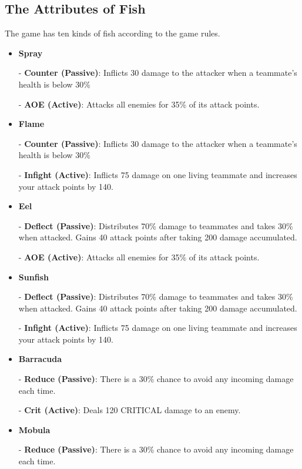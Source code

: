 \subsection{The Attributes of Fish} \label{app:fish_attribute}
The game has ten kinds of fish according to the game rules.
\begin{itemize}[leftmargin=1.5em,itemsep=0pt,parsep=0.2em,topsep=0.0em,partopsep=0.0em]
\item \textbf{Spray} 
    
    - \textbf{Counter (Passive)}: Inflicts 30 damage to the attacker when a teammate's health is below 30\%
    
    - \textbf{AOE (Active)}: Attacks all enemies for 35\% of its attack points.

\item \textbf{Flame}

    - \textbf{Counter (Passive)}: Inflicts 30 damage to the attacker when a teammate's health is below 30\%
    
    - \textbf{Infight (Active)}: Inflicts 75 damage on one living teammate and increases your attack points by 140.

\item \textbf{Eel}

   - \textbf{Deflect (Passive)}: Distributes 70\% damage to teammates and takes 30\% when attacked. Gains 40 attack points after taking 200 damage accumulated.
    
   - \textbf{AOE (Active)}: Attacks all enemies for 35\% of its attack points.

\item \textbf{Sunfish}

    - \textbf{Deflect (Passive)}: Distributes 70\% damage to teammates and takes 30\% when attacked. Gains 40 attack points after taking 200 damage accumulated.
    
    - \textbf{Infight (Active)}: Inflicts 75 damage on one living teammate and increases your attack points by 140.

\item \textbf{Barracuda}

    - \textbf{Reduce (Passive)}: There is a 30\% chance to avoid any incoming damage each time.
    
    - \textbf{Crit (Active)}: Deals 120 CRITICAL damage to an enemy.

\item \textbf{Mobula}

    - \textbf{Reduce (Passive)}: There is a 30\% chance to avoid any incoming damage each time.
    

\end{itemize}
